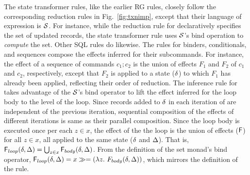The state transformer rules, like the earlier RG rules, closely follow
the corresponding reduction rules in Fig.~\ref{fig:txnimp}, except
that their language of expression is $\mathcal{S}$. For instance, while the
reduction rule for  declaratively specifies the set of
updated records, the state transformer rule uses $\mathcal{S}$'s bind
operation to \emph{compute} the set. Other SQL rules do likewise. The
rules for  binders, conditionals, and sequences compose the
effects inferred for their subcommands. For instance, the effect of a
sequence of commands $c_1;c_2$ is the union of effects $F_1$ and $F_2$
of $c_1$ and $c_2$, respectively, except that $F_2$ is applied to a
state ($\delta$) to which $F_1$ has already been applied, reflecting
their order of reduction. The inference rule for  takes
advantage of the $\mathcal{S}$'s bind operator to lift the effect inferred for
the loop body to the level of the loop. Since records added to $\delta$
in each iteration of  are independent of the previous
iteration, sequential composition of the effects of different
iterations is same as their parallel composition. Since the loop body
is executed once per each $z\in x$, the effect of the the loop is the
union of effects (${\sf F}$) for all $z\in x$, all applied to the same
state ($\delta$ and $\Delta$). That is, ${\sf F}_{loop}(\delta,\Delta) =
\bigcup_{z\in x}{\sf F}_{body}(\delta,\Delta)$. From the definition of the set
monad's bind operator, ${\sf F}_{loop}(\delta,\Delta) = x \gg= (\lambda
z.~F_{body}(\delta,\Delta))$, which mirrors the definition of the rule.


